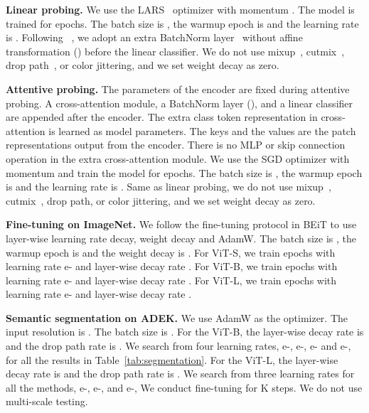 \documentclass[twocolumn]{svjour3}          \smartqed  \usepackage{graphicx}
\begin{document}
\vspace{1mm}
\noindent\textbf{Linear probing.} 
We use the LARS~\cite{you2017large} optimizer with momentum . 
The model is trained for  epochs. The batch size is , the warmup epoch is  and the learning rate is .
Following ~\cite{he2021masked}, we adopt an extra BatchNorm layer~\cite{SergeyIoffe2015BatchNA} without affine transformation () before the linear classifier.
We do not use mixup~\cite{HongyiZhang2017mixupBE}, cutmix~\cite{SangdooYun2019CutMixRS}, drop path~\cite{huang2016stochastic_depth}, or color jittering, and we set weight decay as zero.


\vspace{1mm}
\noindent\textbf{Attentive probing.} 
The parameters of the encoder are fixed during attentive probing.
A cross-attention module, a BatchNorm layer (), and a linear classifier are appended after the encoder.
The extra class token representation in
cross-attention
is learned as model parameters. 
The keys and the values are the patch
representations
output from the encoder. 
There is no MLP or 
skip connection operation
in the extra cross-attention module.
We use the SGD optimizer with momentum  and train the model for  epochs. The batch size is , the warmup epoch is  and the learning rate is . 
Same as linear probing,
we do not use mixup~\cite{HongyiZhang2017mixupBE}, cutmix~\cite{SangdooYun2019CutMixRS}, drop path, or color jittering, and we set weight decay as zero.



\vspace{1mm}
\noindent\textbf{Fine-tuning on ImageNet.}
We follow the fine-tuning protocol in BEiT to use layer-wise learning rate decay, weight decay and AdamW. 
The batch size is , the warmup epoch is  and the weight decay is . For ViT-S, we train  epochs with learning rate e- and layer-wise decay rate . For ViT-B, we train  epochs with learning rate e- and layer-wise decay rate .
For ViT-L, we train  epochs with learning rate e- and layer-wise decay rate .


\vspace{1mm}
\noindent\textbf{Semantic segmentation on ADEK.}
We use AdamW
as the optimizer. The input resolution is . The batch size is .
For the ViT-B, the layer-wise decay rate is  and the drop path rate is . We search from four learning rates, e-, e-, e- and e-, for all the results in Table~\ref{tab:segmentation}.
For the ViT-L, the layer-wise decay rate is  and the drop path rate is . We search from three learning rates for all the methods, e-, e-, and e-,
We conduct fine-tuning for K steps. We do not use multi-scale testing.
\end{document}
